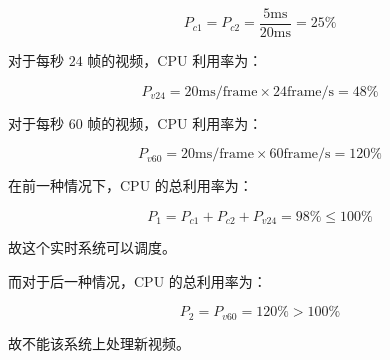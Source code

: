 $$
P_{c1} = P_{c2} = \frac{5\text{ms}}{20\text{ms}} = 25\%
$$

对于每秒 $24$ 帧的视频，CPU 利用率为：

$$
P_{v24} = 20\text{ms/frame} \times 24\text{frame/s} = 48\%
$$

对于每秒 $60$ 帧的视频，CPU 利用率为：

$$
P_{v60} = 20\text{ms/frame} \times 60\text{frame/s} = 120\%
$$

在前一种情况下，CPU 的总利用率为：

$$
P_1 = P_{c1} + P_{c2} + P_{v24} = 98\% \le 100\%
$$

故这个实时系统可以调度。

而对于后一种情况，CPU 的总利用率为：

$$
P_2 = P_{v60} = 120\% > 100\%
$$

故不能该系统上处理新视频。
